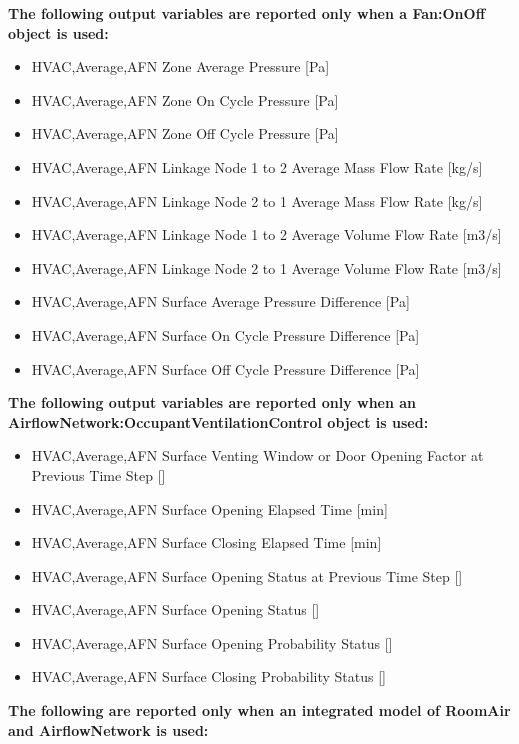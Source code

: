 \textbf{The following output variables are reported only when a Fan:OnOff object is used:}

\begin{itemize}
\item
  HVAC,Average,AFN Zone Average Pressure {[}Pa{]}
\item
  HVAC,Average,AFN Zone On Cycle Pressure {[}Pa{]}
\item
  HVAC,Average,AFN Zone Off Cycle Pressure {[}Pa{]}
\item
  HVAC,Average,AFN Linkage Node 1 to 2 Average Mass Flow Rate {[}kg/s{]}
\item
  HVAC,Average,AFN Linkage Node 2 to 1 Average Mass Flow Rate {[}kg/s{]}
\item
  HVAC,Average,AFN Linkage Node 1 to 2 Average Volume Flow Rate {[}m3/s{]}
\item
  HVAC,Average,AFN Linkage Node 2 to 1 Average Volume Flow Rate {[}m3/s{]}
\item
  HVAC,Average,AFN Surface Average Pressure Difference {[}Pa{]}
\item
  HVAC,Average,AFN Surface On Cycle Pressure Difference {[}Pa{]}
\item
  HVAC,Average,AFN Surface Off Cycle Pressure Difference {[}Pa{]}
\end{itemize}

\textbf{The following output variables are reported only when an AirflowNetwork:OccupantVentilationControl object is used:}

\begin{itemize}
\item
  HVAC,Average,AFN Surface Venting Window or Door Opening Factor at Previous Time Step {[]}
\item
  HVAC,Average,AFN Surface Opening Elapsed Time {[}min{]}
\item
  HVAC,Average,AFN Surface Closing Elapsed Time {[}min{]}
\item
  HVAC,Average,AFN Surface Opening Status at Previous Time Step {[]}
\item
  HVAC,Average,AFN Surface Opening Status {[]}
\item
  HVAC,Average,AFN Surface Opening Probability Status {[]}
\item
  HVAC,Average,AFN Surface Closing Probability Status {[]}
\end{itemize}

\textbf{The following are reported only when an integrated model of RoomAir and AirflowNetwork is used:}

